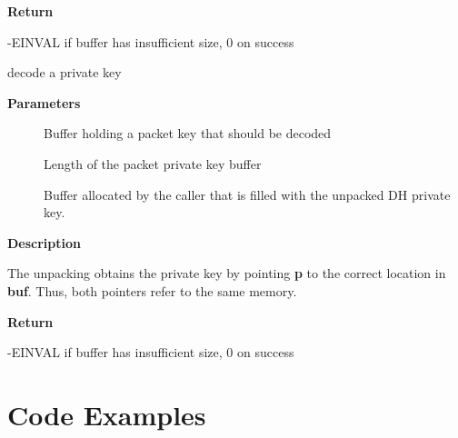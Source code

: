 \documentclass[a4paper,8pt,english]{sphinxmanual}
\begin{document}
\textbf{Return}

-EINVAL if buffer has insufficient size, 0 on success

\begin{fulllineitems}
\label{crypto/api-kpp:c.crypto_dh_decode_key}
decode a private key

\end{fulllineitems}


\textbf{Parameters}
\begin{description}
\item[{}] \leavevmode
Buffer holding a packet key that should be decoded

\item[{}] \leavevmode
Length of the packet private key buffer

\item[{}] \leavevmode
Buffer allocated by the caller that is filled with the
unpacked DH private key.

\end{description}

\textbf{Description}

The unpacking obtains the private key by pointing \textbf{p} to the correct location
in \textbf{buf}. Thus, both pointers refer to the same memory.

\textbf{Return}

-EINVAL if buffer has insufficient size, 0 on success


\chapter{Code Examples}
\label{crypto/api-samples:code-examples}\label{crypto/api-samples::doc}
\end{document}
